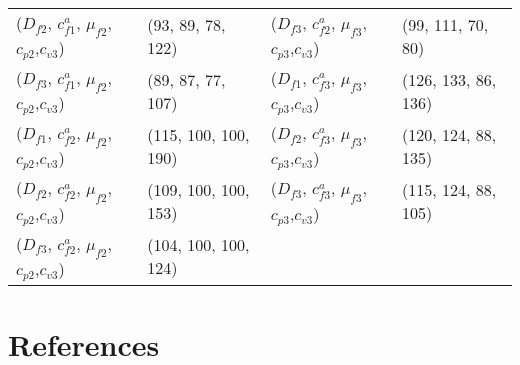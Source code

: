 \documentclass[preprint,12pt]{elsarticle}
\begin{document}
\begin{appendices}
\begin{table}[htbp]
\begin{tabular}{llll}
    ($D_{f2}$, $c^{a}_{f1}$, $\mu_{f2}$, $c_{p2}$,$c_{v3}$) & (93, 89, 78, 122) & ($D_{f3}$, $c^{a}_{f2}$, $\mu_{f3}$, $c_{p3}$,$c_{v3}$) & (99, 111, 70, 80) \\
    ($D_{f3}$, $c^{a}_{f1}$, $\mu_{f2}$, $c_{p2}$,$c_{v3}$) & (89, 87, 77, 107) & ($D_{f1}$, $c^{a}_{f3}$, $\mu_{f3}$, $c_{p3}$,$c_{v3}$) & (126, 133, 86, 136) \\
    ($D_{f1}$, $c^{a}_{f2}$, $\mu_{f2}$, $c_{p2}$,$c_{v3}$) & (115, 100, 100, 190) & ($D_{f2}$, $c^{a}_{f3}$, $\mu_{f3}$, $c_{p3}$,$c_{v3}$) & (120, 124, 88, 135) \\
    ($D_{f2}$, $c^{a}_{f2}$, $\mu_{f2}$, $c_{p2}$,$c_{v3}$) & (109, 100, 100, 153) & ($D_{f3}$, $c^{a}_{f3}$, $\mu_{f3}$, $c_{p3}$,$c_{v3}$) & (115, 124, 88, 105) \\
    ($D_{f3}$, $c^{a}_{f2}$, $\mu_{f2}$, $c_{p2}$,$c_{v3}$) & (104, 100, 100, 124) &       &  \\
    \bottomrule
    \end{tabular}%
  \label{tab:oppdetailresults3}%
\end{table}%

\end{appendices}

\newpage
\section{References}
%


\end{document}
